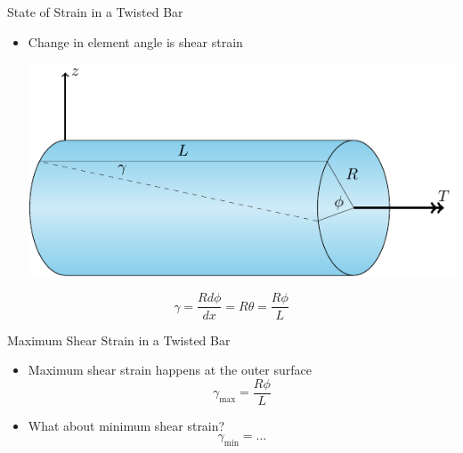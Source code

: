 \documentclass[10pt, svgnames]{beamer}
\begin{document}
\begin{frame}[label={sec:org7e31a74}]{State of Strain in a Twisted Bar}
\begin{itemize}
\item Change in element angle is shear strain

\begin{center}
\includegraphics[width=.9\linewidth]{pictures/state-of-strain.pdf}
\end{center}
\end{itemize}

\[\gamma = \frac{Rd\phi}{dx} = R\theta = \frac{R\phi}{L}\]
\end{frame}

\begin{frame}[label={sec:orgc6bcefa}]{Maximum Shear Strain in a Twisted Bar}
\begin{itemize}
\item Maximum shear strain happens at the outer surface
\[\gamma_{\max} = \frac{R \phi}{L}\]

\item What about minimum shear strain? \[\gamma_{\min} = \ldots\]
\end{itemize}
\end{frame}
\end{document}
